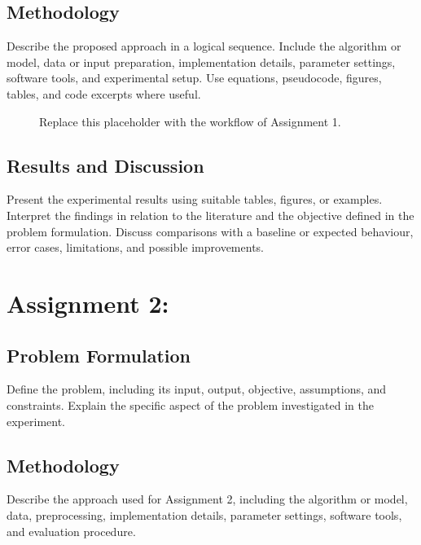\documentclass{ai-lab-report}
\begin{document}
\subsection{Methodology}
Describe the proposed approach in a logical sequence. Include the algorithm or model, data or input preparation, implementation details, parameter settings, software tools, and experimental setup. Use equations, pseudocode, figures, tables, and code excerpts where useful.

\begin{figure}[H]
  \centering
  \caption{Replace this placeholder with the workflow of Assignment 1.}
  \label{fig:workflow}
\end{figure}

\subsection{Results and Discussion}
Present the experimental results using suitable tables, figures, or examples. Interpret the findings in relation to the literature and the objective defined in the problem formulation. Discuss comparisons with a baseline or expected behaviour, error cases, limitations, and possible improvements.

\section{Assignment 2: }

\subsection{Problem Formulation}
Define the problem, including its input, output, objective, assumptions, and constraints. Explain the specific aspect of the problem investigated in the experiment.

\subsection{Methodology}
Describe the approach used for Assignment 2, including the algorithm or model, data, preprocessing, implementation details, parameter settings, software tools, and evaluation procedure.
\end{document}
